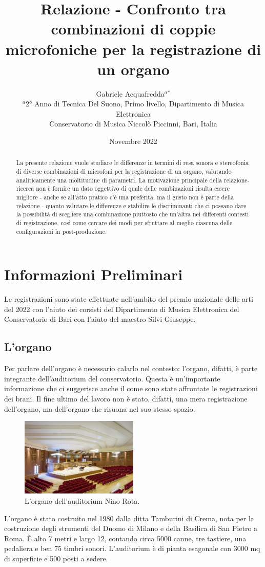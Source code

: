 \documentclass{article}
\title{Relazione - Confronto tra combinazioni di coppie microfoniche per la registrazione di un organo}
\author{Gabriele Acquafredda$^{a}$$^{*}$ \\
    \small $^{a}$2° Anno di Tecnica Del Suono, Primo livello, Dipartimento di Musica Elettronica\\
    \small  Conservatorio di Musica Niccolò Piccinni, Bari, Italia\\
}
\date{Novembre 2022}
\begin{document}
\maketitle

\begin{abstract} 
    \noindent La presente relazione vuole studiare le differenze in termini di resa sonora e stereofonia di diverse combinazioni di microfoni per la registrazione di un organo, valutando analiticamente una moltitudine di parametri. La motivazione principale della relazione-ricerca non è fornire un dato oggettivo di quale delle combinazioni risulta essere migliore - anche se all'atto pratico c'è una preferita, ma il gusto non è parte della relazione - quanto valutare le differenze e stabilire le discriminanti che ci possano dare la possibilità di scegliere una combinazione piuttosto che un'altra nei differenti contesti di registrazione, così come cercare dei modi per sfruttare al meglio ciascuna delle configurazioni in post-produzione.
\end{abstract}

\section{Informazioni Preliminari}

Le registrazioni sono state effettuate nell'ambito del premio nazionale delle arti del 2022 con l'aiuto dei corsisti del Dipartimento di Musica Elettronica del Conservatorio di Bari con l'aiuto del maestro Silvi Giuseppe. 

\subsection{L'organo}

    Per parlare dell'organo è necessario calarlo nel contesto: l'organo, difatti, è parte integrante dell'auditorium del conservatorio. Questa è un'importante informazione che ci suggerisce anche il come sono state affrontate le registrazioni dei brani. Il fine ultimo del lavoro non è stato, difatti, una mera registrazione dell'organo, ma dell'organo che risuona nel suo stesso spazio. 
    \begin{figure}[H]
        \centering
        \includegraphics[width=0.5\textwidth]{images/auditorium-organo.jpg}
        \caption{\label{fig1}L'organo dell'auditorium Nino Rota.}
    \end{figure}
    \noindent L'organo è stato costruito nel 1980 dalla ditta Tamburini di Crema, nota per la costruzione degli strumenti del Duomo di Milano e della Basilica di San Pietro a Roma. È alto 7 metri e largo 12, contando circa 5000 canne, tre tastiere, una pedaliera e ben 75 timbri sonori.
    L'auditorium è di pianta esagonale con 3000 mq di superficie e 500 posti a sedere. 
\endsubsection
\end{document}
